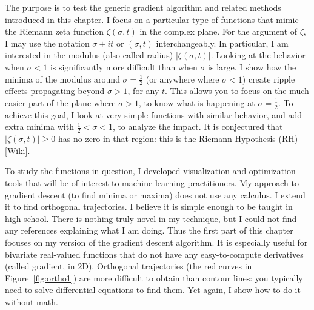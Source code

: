 \documentclass[oneside,10pt]{book}
\begin{document}
The purpose is to test the generic gradient algorithm and related methods introduced in this chapter. I focus on a particular type of functions that mimic the Riemann zeta function $\zeta(\sigma,t)$ in the complex plane. For the argument of $\zeta$, I may use the notation $\sigma+it$ or
$(\sigma, t)$ interchangeably. In particular, I am interested in the modulus (also called radius)
 $|\zeta(\sigma,t)|$. Looking at the behavior when $\sigma<1$ is significantly more difficult than when $\sigma$ is large. I show how the minima of the modulus around $\sigma=\frac{1}{2}$ (or anywhere  where $\sigma<1$) create ripple effects propagating beyond $\sigma> 1$, for any $t$. This allows you to focus on the much easier part of the plane where $\sigma>1$, to know what is happening at $\sigma=\frac{1}{2}$. To achieve this goal, I look at very simple functions with similar behavior, and add extra minima with $\frac{1}{2} < \sigma < 1$, to analyze the impact. It is conjectured that $|\zeta(\sigma,t)|\geq 0$ has no zero in that region: this is the
\textcolor{index}{Riemann Hypothesis} (RH) [\href{https://en.wikipedia.org/wiki/Riemann_hypothesis}{Wiki}]. %

To study the functions in question, I developed visualization and optimization tools that will be of interest to machine learning practitioners.
 My approach to gradient descent (to find minima or maxima) does not use any calculus. I extend it to find orthogonal trajectories. I believe it is simple enough to be taught in high school. There is nothing truly novel in my technique, but I could not find any references explaining what I am doing. Thus the first part of this chapter focuses on my version of the gradient descent algorithm. It is especially useful for bivariate real-valued  functions
 that do not have any easy-to-compute derivatives (called gradient, in 2D). Orthogonal trajectories (the red curves in Figure~\ref{fig:ortho1}) are more difficult to obtain than contour lines: you typically need to solve differential equations to find them. Yet again, I show how to do it  without math.
\end{document}
